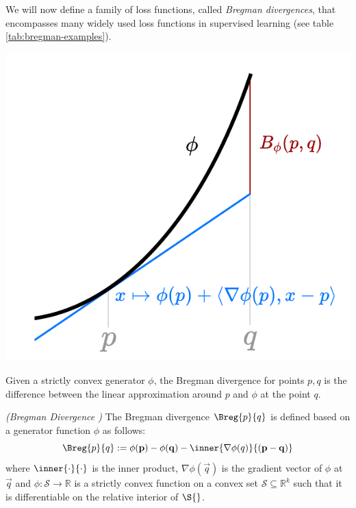 \documentclass[
    a4paper, %
	fontsize=10pt, %
	twoside=false, %
]{kaobook}
\begin{document}
We will now define a family of loss functions, called \textit{Bregman divergences}, that encompasses many widely used loss functions in supervised learning (see table \ref{tab:bregman-examples}). 

\begin{marginfigure} \label{fig:bias-variance-tradeoff}
    \includegraphics[width=\textwidth]{figma-illustrations/bregman-div-intuition}
    \caption{Given a strictly convex generator $\phi$, the Bregman divergence for points $p, q$ is the difference between the linear approximation around $p$ and $\phi$ at the point $q$. }
\end{marginfigure}
\begin{definition} \label{def:bregman-divergence}
\textit{(Bregman Divergence \cite{pfau, adlam22})} The Bregman divergence $\Breg{p}{q}$  is defined based on a generator function $\phi$ as follows:
$$
\Breg{p}{q} := \phi(\vec{p}) - \phi(\vec{q}) - \inner{\nabla \phi(q)}{(\vec{p} - \vec{q})}
$$
where $\inner{\cdot}{\cdot}$ is the inner product, $\nabla \phi(\vec{q})$ is the gradient vector of $\phi$ at $\vec{q}$ and $\phi: \mathcal{S} \to \mathbb{R}$ is a strictly convex function on a convex set $\mathcal{S} \subseteq \mathbb{R}^k$ such that it is differentiable on the relative interior of $\mathcal{\S{}}$.
\end{definition}
\end{document}
